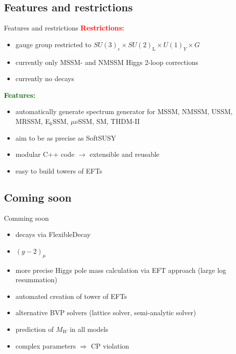 \documentclass[hyperref={pdfpagelabels=false},ngerman]{beamer}
\renewcommand{\emph}{\textbf}
\newcommand{\UY}{\ensuremath{U(1)_{Y}}}
\newcommand{\SUL}{\ensuremath{SU(2)_\text{L}}}
\newcommand{\SUc}{\ensuremath{SU(3)_\text{c}}}
\begin{document}
\subsection{Features and restrictions}

\begin{frame}{Features and restrictions}
  \emph{\textcolor{red}{Restrictions:}}
  \begin{itemize}
  \item gauge group restricted to $\SUc\times\SUL\times\UY\times G$
  \item currently only MSSM- and NMSSM Higgs 2-loop corrections
  \item currently no decays
  \end{itemize}
  \emph{\textcolor{darkgreen}{Features:}}
  \begin{itemize}
  \item automatically generate spectrum generator for MSSM, NMSSM,
    USSM, MRSSM, E$_6$SSM, $\mu\nu$SSM, SM, THDM-II
  \item aim to be as precise as SoftSUSY
  \item modular C++ code $\rightarrow$ extensible and reusable
  \item easy to build towers of EFTs
  \end{itemize}  
\end{frame}

\subsection{Coming soon}

\begin{frame}{Comming soon}
  \begin{itemize}
  \item decays via FlexibleDecay
  \item $(g-2)_\mu$
  \item more precise Higgs pole mass calculation via EFT approach
    (large log resummation)
  \item automated creation of tower of EFTs
  \item alternative BVP solvers (lattice solver, semi-analytic solver)
  \item prediction of $M_W$ in all models
  \item complex parameters $\Rightarrow$ CP violation
  \end{itemize}
\end{frame}
\end{document}
